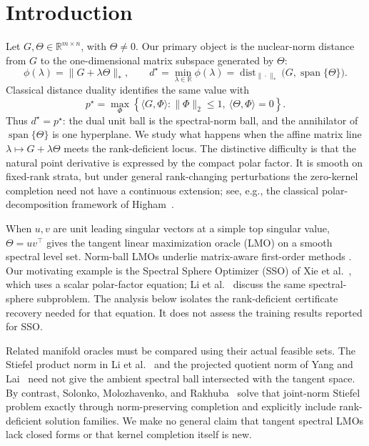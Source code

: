 \section{Introduction}
\label{sec:intro}

Let \(G,\Theta\in\mathbb R^{m\times n}\), with \(\Theta\ne0\).  Our primary
object is the nuclear-norm distance from \(G\) to the one-dimensional matrix
subspace generated by \(\Theta\):
\begin{equation}
 \phi(\lambda)=\|G+\lambda\Theta\|_*,\qquad
 d^\star=\min_{\lambda\in\mathbb R}\phi(\lambda)
 =\operatorname{dist}_{\|\cdot\|_*}
   \bigl(G,\operatorname{span}\{\Theta\}\bigr).
 \label{eq:D}
\end{equation}
Classical distance duality identifies the same value with
\begin{equation}
 p^\star=
 \max_{\Phi}
 \left\{\langle G,\Phi\rangle:
 \|\Phi\|_2\le1,\ \langle\Theta,\Phi\rangle=0\right\}.
 \label{eq:P}
\end{equation}
Thus \(d^\star=p^\star\): the dual unit ball is the spectral-norm ball, and
the annihilator of \(\operatorname{span}\{\Theta\}\) is one hyperplane.  We
study what happens when the affine matrix line
\(\lambda\mapsto G+\lambda\Theta\) meets the rank-deficient locus.  The
distinctive difficulty is that the natural point derivative is expressed by
the compact polar factor.  It is smooth on fixed-rank strata, but under
general rank-changing perturbations the zero-kernel completion need not have a
continuous extension; see, e.g., the classical polar-decomposition framework
of Higham~\cite{higham1986polar}.

When \(u,v\) are unit leading singular vectors at a simple top singular
value, \(\Theta=uv^\top\) gives the tangent linear maximization oracle
(LMO) on a smooth spectral level set.  Norm-ball LMOs underlie matrix-aware
first-order methods \citep{pethick2025lmo}.
Our motivating example is the Spectral Sphere Optimizer (SSO) of
Xie et al.~\cite[Section 3.2 and Appendix A.2, version 3]{xie2026controlled}, which uses a
scalar polar-factor equation; Li et al.~\cite[Appendix P.5]{li2026intrinsic} discuss the
same spectral-sphere subproblem.  The analysis below isolates the
rank-deficient certificate recovery needed for that equation.  It does not
assess the training results reported for SSO.

Related manifold oracles must be compared using their actual feasible sets.
The Stiefel product norm in Li et al.~\cite[Appendix H.3]{li2026intrinsic} and the
projected quotient norm of Yang and Lai~\cite{yang2026manifold} need not give the ambient
spectral ball intersected with the tangent space.  By contrast,
Solonko, Molozhavenko, and Rakhuba~\cite{solonko2026skewon} solve that joint-norm Stiefel problem exactly through
norm-preserving completion and explicitly include rank-deficient solution
families.  We make no general claim that tangent spectral LMOs lack closed
forms or that kernel completion itself is new.


